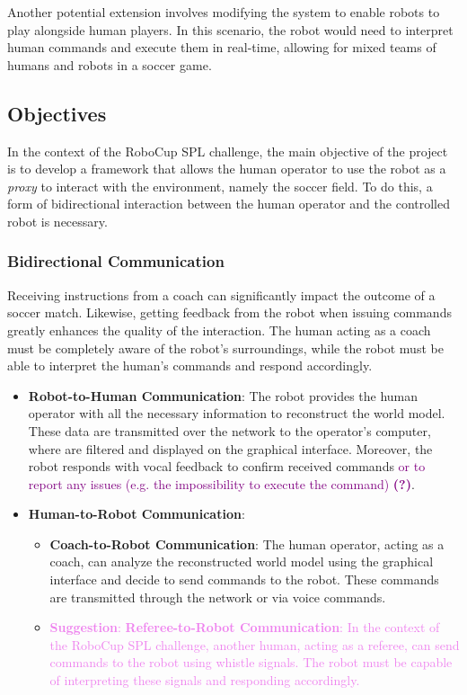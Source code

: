 \documentclass[a4paper, onecolumn, 12pt]{article}
\newcommand\suggestion[1]{\textcolor{violet}{\textbf{Suggestion}: #1}}
\newcommand\doubt[1]{\textcolor{purple}{#1 \textbf{(?)}}}
\begin{document}
Another potential extension involves modifying the system to enable robots to play alongside human players. 
In this scenario, the robot would need to interpret human commands and execute them in real-time, allowing 
for mixed teams of humans and robots in a soccer game.

\subsection{Objectives}
\label{sec:obj}
In the context of the RoboCup SPL challenge, the main objective of the project is to develop a framework
that allows the human operator to use the robot as a \textit{proxy} to interact with the environment, namely the soccer
field. 
To do this, a form of bidirectional interaction between the human operator and the controlled robot is necessary. 

\subsubsection{Bidirectional Communication}  
Receiving instructions from a coach can significantly impact the outcome of a soccer match. 
Likewise, getting feedback from the robot when issuing commands greatly enhances 
the quality of the interaction. The human acting as a coach must be completely aware of the robot's surroundings,
while the robot must be able to interpret the human's commands and respond accordingly. 
\begin{itemize}  
    \item \textbf{Robot-to-Human Communication}: The robot provides the human operator with 
    all the necessary information to reconstruct the world model. These data are transmitted 
    over the network to the operator's computer, where are filtered and displayed on the 
    graphical interface. Moreover, the robot responds with vocal feedback to confirm received 
    commands \doubt{or to report any issues (e.g. the impossibility to execute the command)}.  
    \item \textbf{Human-to-Robot Communication}:  
    \begin{itemize}  
        \item \textbf{Coach-to-Robot Communication}: The human operator, acting as a coach, can 
        analyze the reconstructed world model using the graphical interface and decide to send commands to the robot. 
        These commands are transmitted through the network or via voice commands.  
        \item \suggestion{\textbf{Referee-to-Robot Communication}: In the context of the RoboCup 
        SPL challenge, another human, acting as a referee, can send commands to the robot using 
        whistle signals. The robot must be capable of interpreting these signals and responding 
        accordingly.}  
    \end{itemize}  
\end{itemize}
\end{document}
